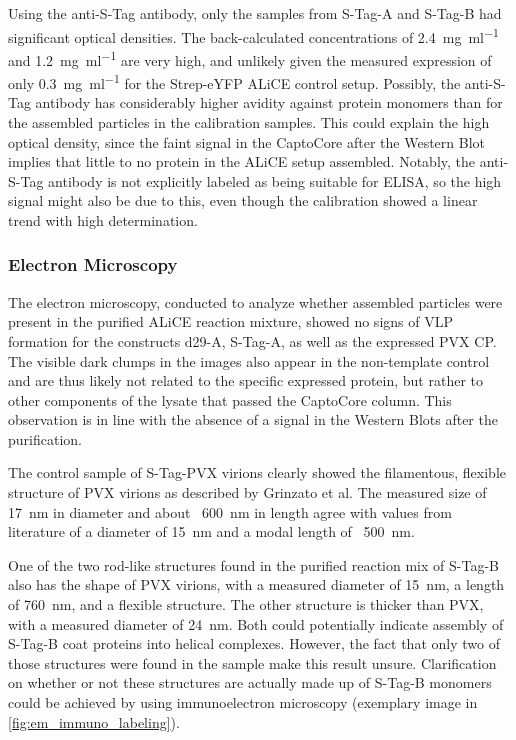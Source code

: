 Using the anti-S-Tag antibody, only the samples from S-Tag-A and S-Tag-B had significant optical densities. The back-calculated concentrations of \SI{2.4}{\milli\gram\per\milli\litre} and \SI{1.2}{\milli\gram\per\milli\litre} are very high, and unlikely given the measured expression of only \SI{0.3}{\milli\gram\per\milli\litre} for the Strep-eYFP ALiCE control setup. Possibly, the anti-S-Tag antibody has considerably higher avidity against protein monomers than for the assembled particles in the calibration samples. This could explain the high optical density, since the faint signal in the CaptoCore after the Western Blot implies that little to no protein in the ALiCE setup assembled. Notably, the anti-S-Tag antibody is not explicitly labeled as being suitable for ELISA, so the high signal might also be due to this, even though the calibration showed a linear trend with high determination.

\subsubsection{Electron Microscopy}
The electron microscopy, conducted to analyze whether assembled particles were present in the purified ALiCE reaction mixture, showed no signs of VLP formation for the constructs d29-A, S-Tag-A, as well as the expressed PVX CP. The visible dark clumps in the images also appear in the non-template control and are thus likely not related to the specific expressed protein, but rather to other components of the lysate that passed the CaptoCore column. This observation is in line with the absence of a signal in the Western Blots after the purification. 

The control sample of S-Tag-PVX virions clearly showed the filamentous, flexible structure of PVX virions as described by Grinzato et al. The measured size of \SI{17}{\nano\meter} in diameter and about ~\SI{600}{\nano\meter} in length agree with values from literature of a diameter of \SI{15}{\nano\meter} and a modal length of ~\SI{500}{\nano\meter}. 

One of the two rod-like structures found in the purified reaction mix of S-Tag-B also has the shape of PVX virions, with a measured diameter of \SI{15}{\nano\meter}, a length of \SI{760}{\nano\meter}, and a flexible structure. The other structure is thicker than PVX, with a measured diameter of \SI{24}{\nano\meter}. Both could potentially indicate assembly of S-Tag-B coat proteins into helical complexes. However, the fact that only two of those structures were found in the sample make this result unsure. Clarification on whether or not these structures are actually made up of S-Tag-B monomers could be achieved by using immunoelectron microscopy (exemplary image in \ref{fig:em_immuno_labeling}).

